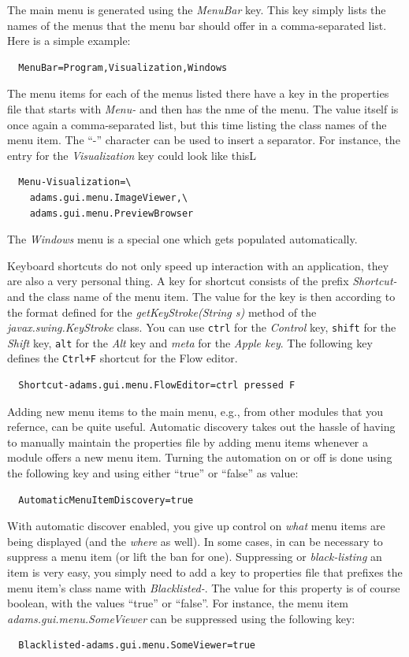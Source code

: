 The main menu is generated using the \textit{MenuBar} key. This key simply lists
the names of the menus that the menu bar should offer in a comma-separated
list. Here is a simple example:
\begin{verbatim}
  MenuBar=Program,Visualization,Windows
\end{verbatim}
The menu items for each of the menus listed there have a key in the properties
file that starts with \textit{Menu-} and then has the nme of the menu. The value
itself is once again a comma-separated list, but this time listing the class
names of the menu item. The ``-'' character can be used to insert a separator.
For instance, the entry for the \textit{Visualization} key could look like thisL
\begin{verbatim}
  Menu-Visualization=\
    adams.gui.menu.ImageViewer,\
    adams.gui.menu.PreviewBrowser
\end{verbatim}
The \textit{Windows} menu is a special one which gets populated automatically. 

\heading{Shortcuts}
Keyboard shortcuts do not only speed up interaction with an application, they 
are also a very personal thing. A key for shortcut consists of the prefix
\textit{Shortcut-} and the class name of the menu item. The value for the 
key is then according to the format defined for the \textit{getKeyStroke(String s)}
method of the \textit{javax.swing.KeyStroke} class. You can use \texttt{ctrl}
for the \textit{Control} key, \texttt{shift} for the \textit{Shift} key,
\texttt{alt} for the \textit{Alt} key and \textit{meta} for the 
\textit{Apple key}. The following key defines the \texttt{Ctrl+F} shortcut
for the Flow editor.
\begin{verbatim}
  Shortcut-adams.gui.menu.FlowEditor=ctrl pressed F
\end{verbatim}

Adding new menu items to the main menu, e.g., from other modules that you 
refernce, can be quite useful. Automatic discovery takes out the hassle of
having to manually maintain the properties file by adding menu items whenever 
a module offers a new menu item. Turning the automation on or off is done using
the following key and using either ``true'' or ``false'' as value:
\begin{verbatim}
  AutomaticMenuItemDiscovery=true
\end{verbatim}

With automatic discover enabled, you give up control on \textit{what} menu 
items are being displayed (and the \textit{where} as well). In some cases, 
in can be necessary to suppress a menu item (or lift the ban for one).
Suppressing or \textit{black-listing} an item is very easy, you simply need
to add a key to properties file that prefixes the menu item's class name 
with \textit{Blacklisted-}. The value for this property is of course boolean,
with the values ``true'' or ``false''. For instance, the menu item 
\textit{adams.gui.menu.SomeViewer} can be suppressed using the following key:
\begin{verbatim}
  Blacklisted-adams.gui.menu.SomeViewer=true
\end{verbatim}

